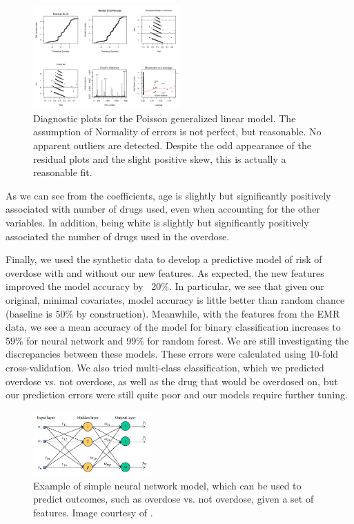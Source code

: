 \documentclass{article}
\begin{document}
\begin{figure}[h]
\centering
\includegraphics[width=0.5\textwidth]{diags.png}
\caption{Diagnostic plots for the Poisson generalized linear model. The assumption of Normality of errors is not perfect, but reasonable. No apparent outliers are detected. Despite the odd appearance of the residual plots and the slight positive skew, this is actually a reasonable fit.}
\label{fig:diags}
\end{figure}

As we can see from the coefficients, age is slightly but significantly positively associated with number of drugs used, even when accounting for the other variables. In addition, being white is slightly but significantly positively associated the number of drugs used in the overdose.

Finally, we used the synthetic data to develop a predictive model of risk of overdose with and without our new features. As expected, the new features improved the model accuracy by ~20\%. In particular, we see that given our original, minimal covariates, model accuracy is little better than random chance (baseline is 50\% by construction). Meanwhile, with the features from the EMR data, we see a mean accuracy of the model for binary classification increases to 59\% for neural network and 99\% for random forest. We are still investigating the discrepancies between these models. These errors were calculated using 10-fold cross-validation. We also tried multi-class classification, which we predicted overdose vs. not overdose, as well as the drug that would be overdosed on, but our prediction errors were still quite poor and our models require further tuning.

\begin{figure}[h]
\centering
\includegraphics[width=0.4\textwidth]{NN}
\caption{Example of simple neural network model, which can be used to predict outcomes, such as overdose vs. not overdose, given a set of features. Image courtesy of \cite{lee2013}.}
\label{fig:NN}
\end{figure}
\end{document}
